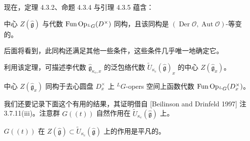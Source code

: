 
现在，定理 4.3.2、命题 4.3.4 与引理 4.3.5 蕴含：

\begin{theorem}
    中心 $Z(\hat{\mathfrak{g}})$ 与代数 $\operatorname{Fun}\operatorname{Op}_{{}^LG}(D^\times)$ 同构，且该同构是 $(\operatorname{Der}\mathcal{O},\operatorname{Aut}\mathcal{O})$-等变的。
\end{theorem}

后面将看到，此同构还满足其他一些条件，这些条件几乎唯一地确定它。

利用该定理，可描述李代数 $\hat{\mathfrak{g}}_{\kappa_c,x}$ 的泛包络代数 $\widetilde{U}_{\kappa_c}(\hat{\mathfrak{g}})_x$ 的中心 $Z(\hat{\mathfrak{g}}_x)$。

\begin{corollary}
    中心 $Z(\hat{\mathfrak{g}}_x)$ 同构于去心圆盘 $D_x^\times$ 上 ${}^LG$-opers 空间上函数代数 $\operatorname{Fun}\operatorname{Op}_{{}^LG}(D_x^\times)$。
\end{corollary}

我们还要记录下面这个有用的结果，其证明借自 [Beilinson and Drinfeld 1997] 注 3.7.11(iii)。注意群 $G((t))$ 自然作用在 $\widetilde{U}_{\kappa_c}(\hat{\mathfrak{g}})$ 上。

\begin{proposition}
    $G((t))$ 在 $Z(\hat{\mathfrak{g}})\subset\widetilde{U}_{\kappa_c}(\hat{\mathfrak{g}})$ 上的作用是平凡的。
\end{proposition}

